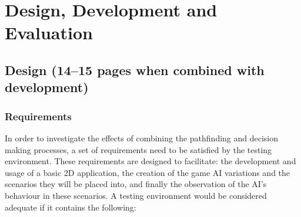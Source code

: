 \documentclass[11pt, a4paper]{report}
\begin{document}
\chapter{Design, Development and Evaluation}
\label{chapter:designDevelopmentAndEvaluation}

\section{Design (14--15 pages when combined with development)}
\label{sec:design}

\subsection{Requirements}
\label{subsec:requirements}

In order to investigate the effects of combining the pathfinding and decision making processes, a set of requirements need to be satisfied by the testing environment. These requirements are designed to facilitate: the development and usage of a basic 2D application, the creation of the game AI variations and the scenarios they will be placed into, and finally the observation of the AI's behaviour in these scenarios. A testing environment would be considered adequate if it contains the following:
\end{document}
